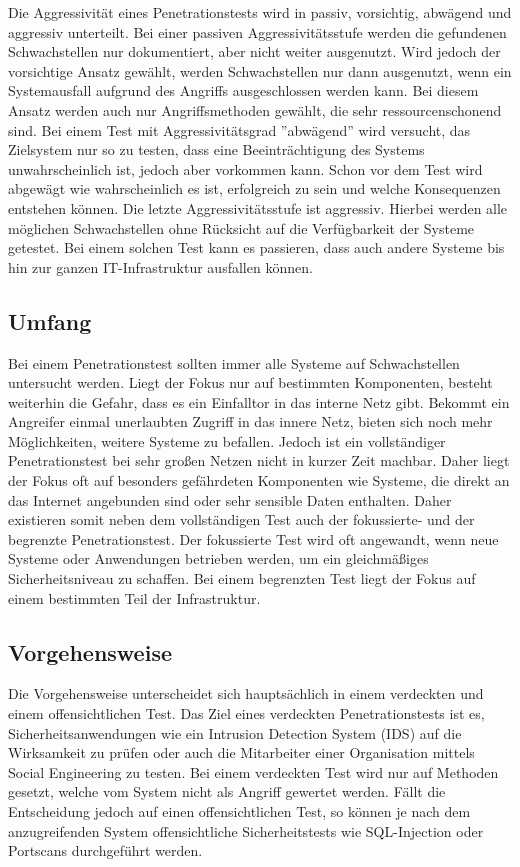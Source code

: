 Die Aggressivität eines Penetrationstests wird in passiv, vorsichtig, abwägend und aggressiv unterteilt. Bei
einer passiven Aggressivitätsstufe werden die gefundenen Schwachstellen nur dokumentiert, aber nicht weiter
ausgenutzt. Wird jedoch der vorsichtige Ansatz gewählt, werden Schwachstellen nur dann ausgenutzt, wenn ein
Systemausfall aufgrund des Angriffs ausgeschlossen werden kann. Bei diesem Ansatz werden auch nur Angriffsmethoden
gewählt, die sehr ressourcenschonend sind. Bei einem Test mit Aggressivitätsgrad ”abwägend”
wird versucht, das Zielsystem nur so zu testen, dass eine Beeinträchtigung des Systems unwahrscheinlich ist,
jedoch aber vorkommen kann. Schon vor dem Test wird abgewägt wie wahrscheinlich es ist, erfolgreich zu sein
und welche Konsequenzen entstehen können. Die letzte Aggressivitätsstufe ist aggressiv. Hierbei werden alle
möglichen Schwachstellen ohne Rücksicht auf die Verfügbarkeit der Systeme getestet. Bei einem solchen Test
kann es passieren, dass auch andere Systeme bis hin zur ganzen IT-Infrastruktur ausfallen können.

\subsection{Umfang}

Bei einem Penetrationstest sollten immer alle Systeme auf Schwachstellen untersucht werden. Liegt der Fokus
nur auf bestimmten Komponenten, besteht weiterhin die Gefahr, dass es ein Einfalltor in das interne Netz gibt.
Bekommt ein Angreifer einmal unerlaubten Zugriff in das innere Netz, bieten sich noch mehr Möglichkeiten,
weitere Systeme zu befallen. Jedoch ist ein vollständiger Penetrationstest bei sehr großen Netzen nicht in kurzer
Zeit machbar. Daher liegt der Fokus oft auf besonders gefährdeten Komponenten wie Systeme, die direkt an das
Internet angebunden sind oder sehr sensible Daten enthalten. Daher existieren somit neben dem vollständigen
Test auch der fokussierte- und der begrenzte Penetrationstest. Der fokussierte Test wird oft angewandt, wenn
neue Systeme oder Anwendungen betrieben werden, um ein gleichmäßiges Sicherheitsniveau zu schaffen. Bei
einem begrenzten Test liegt der Fokus auf einem bestimmten Teil der Infrastruktur.

\subsection{Vorgehensweise}
Die Vorgehensweise unterscheidet sich hauptsächlich in einem verdeckten und einem offensichtlichen Test.
Das Ziel eines verdeckten Penetrationstests ist es, Sicherheitsanwendungen wie ein Intrusion Detection System
(IDS) auf die Wirksamkeit zu prüfen oder auch die Mitarbeiter einer Organisation mittels Social Engineering zu
testen. Bei einem verdeckten Test wird nur auf Methoden gesetzt, welche vom System nicht als Angriff gewertet
werden. Fällt die Entscheidung jedoch auf einen offensichtlichen Test, so können je nach dem anzugreifenden
System offensichtliche Sicherheitstests wie SQL-Injection oder Portscans durchgeführt werden.

